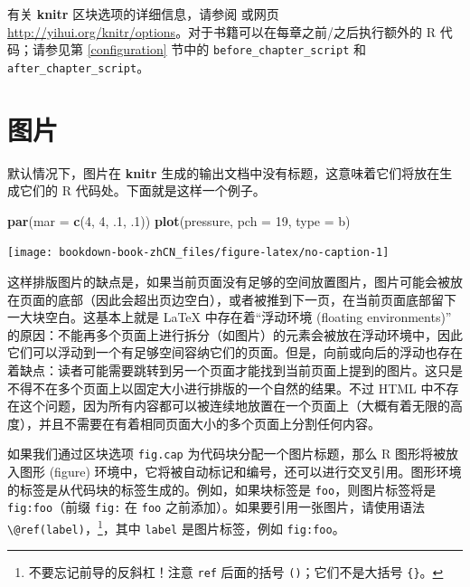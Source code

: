 \documentclass[
  12pt,
]{krantz}
\newenvironment{Shaded}{\begin{snugshade}}{\end{snugshade}}
\newcommand{\AttributeTok}[1]{\textcolor[rgb]{0.13,0.29,0.53}{#1}}
\newcommand{\DecValTok}[1]{\textcolor[rgb]{0.00,0.00,0.81}{#1}}
\newcommand{\FunctionTok}[1]{\textcolor[rgb]{0.13,0.29,0.53}{\textbf{#1}}}
\newcommand{\NormalTok}[1]{#1}
\newcommand{\StringTok}[1]{\textcolor[rgb]{0.31,0.60,0.02}{#1}}
\theoremstyle{definition}
\theoremstyle{definition}
\theoremstyle{definition}
\theoremstyle{definition}
\theoremstyle{remark}
\begin{document}
有关 \textbf{knitr} 区块选项的详细信息，请参阅 \citet{xie2015} 或网页 \url{http://yihui.org/knitr/options}。对于书籍可以在每章之前/之后执行额外的 R 代码；请参见第 \ref{configuration} 节中的 \texttt{before\_chapter\_script} 和 \texttt{after\_chapter\_script}。

\hypertarget{figures}{%
\section{图片}\label{figures}}

默认情况下，图片在 \textbf{knitr} 生成的输出文档中没有标题，这意味着它们将放在生成它们的 R 代码处。下面就是这样一个例子。

\begin{Shaded}
\begin{Highlighting}[]
\FunctionTok{par}\NormalTok{(}\AttributeTok{mar =} \FunctionTok{c}\NormalTok{(}\DecValTok{4}\NormalTok{, }\DecValTok{4}\NormalTok{, .}\DecValTok{1}\NormalTok{, .}\DecValTok{1}\NormalTok{))}
\FunctionTok{plot}\NormalTok{(pressure, }\AttributeTok{pch =} \DecValTok{19}\NormalTok{, }\AttributeTok{type =} \StringTok{\textquotesingle{}b\textquotesingle{}}\NormalTok{)}
\end{Highlighting}
\end{Shaded}

\texttt{[image: bookdown-book-zhCN\_files/figure-latex/no-caption-1]}

这样排版图片的缺点是，如果当前页面没有足够的空间放置图片，图片可能会被放在页面的底部（因此会超出页边空白），或者被推到下一页，在当前页面底部留下一大块空白。这基本上就是 LaTeX 中存在着``浮动环境 (floating environments)'' 的原因：不能再多个页面上进行拆分（如图片）的元素会被放在浮动环境中，因此它们可以浮动到一个有足够空间容纳它们的页面。但是，向前或向后的浮动也存在着缺点：读者可能需要跳转到另一个页面才能找到当前页面上提到的图片。这只是不得不在多个页面上以固定大小进行排版的一个自然的结果。不过 HTML 中不存在这个问题，因为所有内容都可以被连续地放置在一个页面上（大概有着无限的高度），并且不需要在有着相同页面大小的多个页面上分割任何内容。

如果我们通过区块选项 \texttt{fig.cap} 为代码块分配一个图片标题，那么 R 图形将被放入图形 (figure) 环境中，它将被自动标记和编号，还可以进行交叉引用。图形环境的标签是从代码块的标签生成的。例如，如果块标签是 \texttt{foo}，则图片标签将是 \texttt{fig:foo}（前缀 \texttt{fig:} 在 \texttt{foo} 之前添加）。如果要引用一张图片，请使用语法 \texttt{\textbackslash{}@ref(label)}，\footnote{不要忘记前导的反斜杠！注意 \texttt{ref} 后面的括号 \texttt{()}；它们不是大括号 \texttt{\{\}}。}，其中 \texttt{label} 是图片标签，例如 \texttt{fig:foo}。
\end{document}
